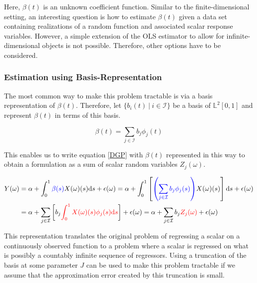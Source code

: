 \documentclass[11pt,twoside,a4paper]{article}
\begin{document}
	Here, $\beta(t)$ is an unknown coefficient function. Similar to the finite-dimensional setting, an interesting question is how to estimate $\beta(t)$ given a data set containing realizations of a random function and associated scalar response variables. However, a simple extension of the OLS estimator to allow for infinite-dimensional objects is not possible. Therefore, other options have to be considered.
	
	\subsubsection{Estimation using Basis-Representation}\label{basis_exp_transf}
	The most common way to make this problem tractable is via a basis representation of $\beta(t)$. Therefore, let $\{b_i(t) \: \vert \: i \in \mathcal{I}\}$ be a basis of $\mathbb{L}^2[0,1]$ and represent $\beta(t)$ in terms of this basis.
	
	\begin{equation}
		\beta(t) = \sum_{j \in \mathcal{I}} b_j \phi_j(t)
	\end{equation}
	
	This enables us to write equation \ref{DGP} with $\beta(t)$ represented in this way to obtain a formulation as a sum of scalar random variables $Z_j(\omega)$.
	
	\begin{equation}
		\begin{split}
			Y(\omega) & = \alpha + \int_{0}^{1} {\color{blue}\beta(s)} X(\omega)(s)\mathrm{d}s + \epsilon(\omega)
			= \alpha + \int_{0}^{1}\left[{\color{blue}\left(\sum_{j \in \mathcal{I}} b_j \phi_j(s)\right)} X(\omega)(s) \right]\mathrm{d}s + \epsilon(\omega) \\
			& = \alpha + \sum_{j \in \mathcal{I}} \left[b_j \textcolor{red}{\int_{0}^{1} X(\omega)(s) \phi_j(s)\mathrm{d}s}\right] + \epsilon(\omega)
		      = \alpha + \sum_{j \in \mathcal{I}} b_j \textcolor{red}{Z_j(\omega)} + \epsilon(\omega)
		\end{split}
	\end{equation}
	
	This representation translates the original problem of regressing a scalar on a continuously observed function to a problem where a scalar is regressed on what is possibly a countably infinite sequence of regressors. Using a truncation of the basis at some parameter $J$ can be used to make this problem tractable if we assume that the approximation error created by this truncation is small.
	
\end{document}
